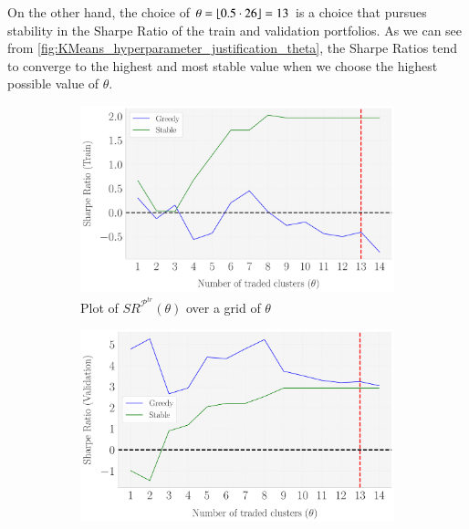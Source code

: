 
On the other hand, the choice of $\theta=\lfloor 0.5\cdot 26 \rfloor=13$ is a choice that pursues stability in the Sharpe Ratio of the train and validation portfolios. As we can see from \cref{fig:KMeans_hyperparameter_justification_theta}, the Sharpe Ratios tend to converge to the highest and most stable value when we choose the highest possible value of $\theta$. 

\begin{figure}[H]
  \caption{Sharpe Ratios in the train and validation splits as a function of $\theta$ (KMeans)}
  \centering
    \begin{subfigure}[b]{0.46\textwidth}
    \centering
    \includegraphics[width=\textwidth]{fig_A2a_KMeans_SR_Train_vs_theta.pdf}
    \caption{Plot of $SR^{\mathcal P^{tr}}(\theta)$ over a grid of $\theta$}
    \label{fig:K_hyp_3}
  \end{subfigure}
  \hspace{0.05\textwidth} %
  \begin{subfigure}[b]{0.46\textwidth}
    \centering
    \includegraphics[width=\textwidth]{fig_A2b_KMeans_SR_Validation_vs_theta.pdf}

\end{subfigure}
\end{figure}

